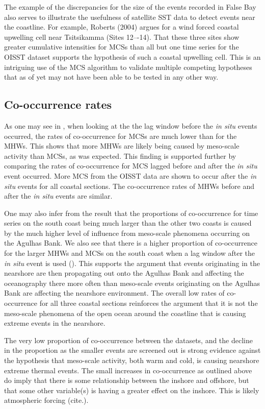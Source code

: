\documentclass[a4paper,10pt,review]{elsarticle}
\begin{document}
The example of the discrepancies for the size of the events recorded in False Bay also serves to illustrate the usefulness of satellite SST data to detect events near the coastline. For example, Roberts (2004) \cite{Roberts2005} argues for a wind forced coastal upwelling cell near Tsitsikamma (Sites 12–-14). That these three sites show greater cumulative intensities for MCSs than all but one time series for the OISST dataset supports the hypothesis of such a coastal upwelling cell. This is an intriguing use of the MCS algorithm to validate multiple competing hypotheses that as of yet may not have been able to be tested in any other way. 

\subsection{Co-occurrence rates}
As one may see in , when looking at the the lag window before the \emph{in situ} events occurred, the rates of co-occurrence for MCSs are much lower than for the MHWs. This shows that more MHWs are likely being caused by meso-scale activity than MCSs, as was expected. This finding is supported further by comparing the rates of co-occurrence for MCS lagged before and after the \emph{in situ} event occurred. More MCS from the OISST data are shown to occur after the \emph{in situ} events for all coastal sections. The co-occurrence rates of MHWs before and after the \emph{in situ} events are similar.

One may also infer from the result that the proportions of co-occurrence for time series on the south coast being much larger than the other two coasts is caused by the much higher level of influence from meso-scale phenomena occurring on the Agulhas Bank. We also see that there is a higher proportion of co-occurrence for the larger MHWs and MCSs on the south coast when a lag window after the \emph{in situ} event is used (). This supports the argument that events originating in the nearshore are then propagating out onto the Agulhas Bank and affecting the oceanography there more often than meso-scale events originating on the Agulhas Bank are affecting the nearshore environment. The overall low rates of co-occurrence for all three coastal sections reinforces the argument that it is not the meso-scale phenomena of the open ocean around the coastline that is causing extreme events in the nearshore.

The very low proportion of co-occurrence between the datasets, and the decline in the proportion as the smaller events are screened out is strong evidence against the hypothesis that meso-scale activity, both warm and cold, is causing nearshore extreme thermal events. The small increases in co-occurrence as outlined above do imply that there is some relationship between the inshore and offshore, but that some other variable(s) is having a greater effect on the inshore. This is likely atmospheric forcing (cite.).
\end{document}
